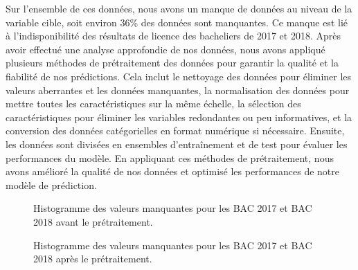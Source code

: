 Sur l’ensemble de ces données, nous avons un manque de données au niveau de la variable cible, soit environ 36\% des données sont manquantes. Ce manque est lié à l’indisponibilité des résultats de licence des bacheliers de 2017 et 2018.
Après avoir effectué une analyse approfondie de nos données, nous avons appliqué plusieurs méthodes de prétraitement des données pour garantir la qualité et la fiabilité de nos prédictions. Cela inclut le nettoyage des données pour éliminer les valeurs aberrantes et les données manquantes, la normalisation des données pour mettre toutes les caractéristiques sur la même échelle, la sélection des caractéristiques pour éliminer les variables redondantes ou peu informatives, et la conversion des données catégorielles en format numérique si nécessaire. Ensuite, les données sont divisées en ensembles d'entraînement et de test pour évaluer les performances du modèle. En appliquant ces méthodes de prétraitement, nous avons amélioré la qualité de nos données et optimisé les performances de notre modèle de prédiction.
\begin{figure}[H]
    \centering
    \setlength{\fboxsep}{5pt}
    \setlength{\fboxrule}{0.5pt}
    \begin{minipage}[t]{0.45\textwidth}
        \centering
        \caption{Histogramme des valeurs manquantes pour les BAC 2017 et BAC 2018 avant le prétraitement.}
    \end{minipage}\hfill
    \begin{minipage}[t]{0.45\textwidth}
        \centering
        \caption{Histogramme des valeurs manquantes pour les BAC 2017 et BAC 2018 après le prétraitement.}
    \end{minipage}
\end{figure}


